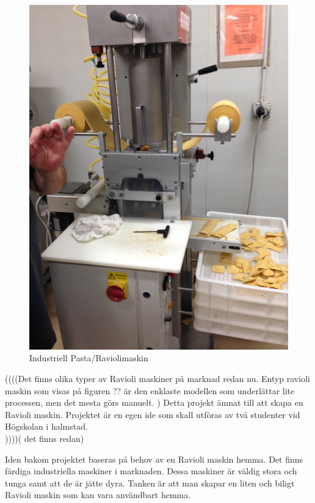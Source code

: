  		\begin{figure}[h]
 			\begin{center}
 				\includegraphics[scale=0.5]{images/ravioli_maskin.png}
 				\caption{Industriell Pasta/Raviolimaskin}
 				\label{pastamaskin}	
 			\end{center}
 		\end{figure}
		

((((Det finns olika typer av Ravioli maskiner på marknad redan nu. Entyp ravioli maskin som visas på figuren ?? är den enklaste modellen som underlättar lite processen, men det mesta görs manuelt. )
Detta projekt  ämnat till att skapa en Ravioli maskin. Projektet är en egen ide som skall utföras av två studenter vid Högskolan i halmstad.\\ ))))( det finns redan)


Iden bakom projektet baseras på behov av en Ravioli maskin hemma.
Det finns färdiga industriella maskiner i marknaden. Dessa maskiner är väldig stora och tunga samt att de är jätte dyra. 
Tanken är att man skapar en liten och biligt Ravioli maskin som kan vara användbart hemma.		

